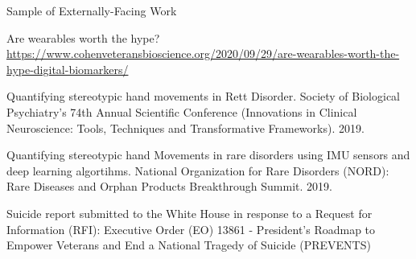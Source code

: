 \vspace{0.2in}
Sample of Externally-Facing Work
\begin{itemize*}
   \item Are wearables worth the hype? 
     \url{https://www.cohenveteransbioscience.org/2020/09/29/are-wearables-worth-the-hype-digital-biomarkers/}
   \item  Quantifying stereotypic hand movements in Rett Disorder. 
     Society of Biological Psychiatry's 74th Annual Scientific Conference
     (Innovations in Clinical Neuroscience: Tools, Techniques and
     Transformative Frameworks). 2019.
   \item  Quantifying stereotypic hand Movements in rare disorders using
     IMU sensors and deep learning algortihms.
     National Organization for Rare
     Disorders (NORD): Rare Diseases and Orphan Products
     Breakthrough Summit. 2019.
   \item  Suicide report submitted to the White House in response to a Request 
     for Information (RFI): Executive Order (EO) 13861  - President’s Roadmap 
     to Empower Veterans and End a National Tragedy of Suicide (PREVENTS)
\end{itemize*}

